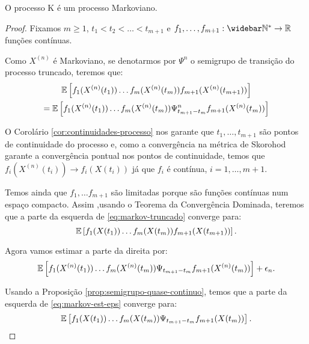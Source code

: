 \begin{teorema}
  \label{teo:proc_markov}
  O processo K é um processo Markoviano.
\end{teorema}

\begin{proof}
  Fixamos $m \geq 1$, $t_1 < t_2 < \ldots < t_{m+1}$ e $f_1, \ldots,
  f_{m+1} : \Nzb \to \R$ funções contínuas.

  Como $X^{(n)}$ é Markoviano, se denotarmos por $\Psi^n$ o semigrupo
  de transição do processo truncado, teremos que:
  \begin{gather}
    \label{eq:markov-truncado}
    {\mathbb{E}} \left[
      f_{1}(X^{(n)}(t_{1})) 
      \ldots
      f_{m}(X^{(n)}(t_{m})) 
      f_{m+1}(X^{(n)}(t_{m+1})) 
    \right] \\
    = {\mathbb{E}} \left[
      f_{1}(X^{(n)}(t_{1})) 
      \ldots
      f_{m}(X^{(n)}(t_{m})) 
      \Psi^n_{t_{m+1} - t_{m}} f_{m+1} (X^{(n)}(t_{m})) 
    \right]\notag
  \end{gather}

  O Corolário \ref{cor:continuidades-processo} nos garante que \qc
  $t_1, \ldots, t_{m+1}$ são pontos de continuidade do processo e,
  como a convergência na métrica de Skorohod garante a convergência
  pontual nos pontos de continuidade, temos que $f_i(X^{(n)}(t_i)) \to
  f_i(X(t_i))$ \qc já que $f_i$ é contínua, $i = 1, \ldots, m+1$.

  Temos ainda que $f_1, \ldots f_{m+1}$ são limitadas porque são
  funções contínuas num espaço compacto. Assim ,usando o Teorema da
  Convergência Dominada, teremos que a parte da esquerda de
  \eqref{eq:markov-truncado} converge para:
  \begin{displaymath}
    {\mathbb{E}} \left[
      f_{1}(X(t_{1})) 
      \ldots
      f_{m}(X(t_{m})) 
      f_{m+1}(X(t_{m+1})) 
    \right].
  \end{displaymath}

  Agora vamos estimar a parte da direita por:
  \begin{equation}
    \label{eq:markov-est-eps}
    {\mathbb{E}} \left[
      f_{1}(X^{(n)}(t_{1})) 
      \ldots
      f_{m}(X^{(n)}(t_{m})) 
      \Psi_{t_{m+1} - t_{m}} f_{m+1} (X^{(n)}(t_{m})) 
    \right] + \epsilon_n.
  \end{equation}

  Usando a Proposição \ref{prop:semigrupo-quase-continuo}, temos que a
  parte da esquerda de \eqref{eq:markov-est-eps} converge para:
  \begin{displaymath}
    {\mathbb{E}} \left[
      f_{1}(X(t_{1})) 
      \ldots
      f_{m}(X(t_{m})) 
      \Psi_{t_{m+1} - t_{m}} f_{m+1} (X(t_{m})) 
    \right].
  \end{displaymath}


\end{proof}
